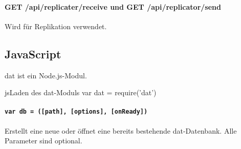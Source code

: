 \paragraph{GET /api/replicater/receive und GET /api/replicator/send}
Wird für Replikation verwendet.

\subsection{JavaScript}
dat ist ein Node.js-Modul.

\begin{srclst}{js}{Laden des dat-Moduls}
var dat = require('dat')
\end{srclst}

\paragraph{\texttt{var db = ([path], [options], [onReady])}}

Erstellt eine neue oder öffnet eine bereits bestehende dat-Datenbank. Alle Parameter sind optional.

